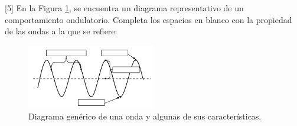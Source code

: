 [5] En la Figura \ref{ondas}, se encuentra un diagrama representativo de un comportamiento ondulatorio. Completa los espacios en blanco con la propiedad de las ondas a la que se refiere:
\begin{figure}[H]
    \centering
    \includegraphics[width =0.5\textwidth ]{Images/onda_blanco.png}
    \caption{Diagrama gen\'erico de una onda y algunas de sus caracter\'isticas.}
    \label{ondas}
\end{figure}